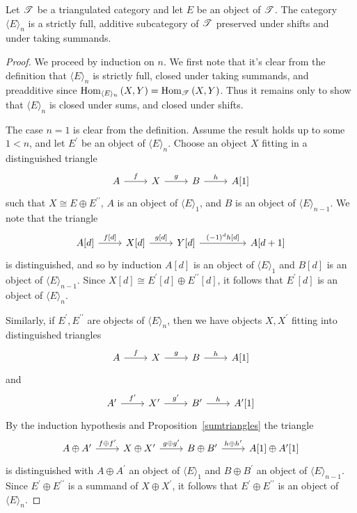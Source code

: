\documentclass[dissertation.tex]{subfiles}
\begin{document}
\begin{lem}
  Let $\mathscr{T}$ be a triangulated category and let $E$ be an object of $\mathscr{T}$.
  The category $\langle E \rangle_n$ is a strictly full, additive subcategory of $\mathscr{T}$ preserved under shifts and under taking summands.
  
  \begin{proof}
    We proceed by induction on $n$.
    We first note that it's clear from the definition that $\langle E \rangle_n$ is strictly full, closed under taking summands, and preadditive since $\operatorname{Hom}_{\langle E \rangle_n}\left(X,Y\right) = \operatorname{Hom}_{\mathscr{T}}\left(X,Y\right)$.
    Thus it remains only to show that $\langle E \rangle_n$ is closed under sums, and closed under shifts.
    
    The case $n = 1$ is clear from the definition.
    Assume the result holds up to some $1 < n$, and let $E^\prime$ be an object of $\langle E \rangle_n$.
    Choose an object $X$ fitting in a distinguished triangle
    $$\begin{tikzcd}
      A \arrow{r}{f} & X \arrow{r}{g} & B \arrow{r}{h} & A[1]
    \end{tikzcd}$$
    such that $X \cong E \oplus E^{\prime\prime}$, $A$ is an object of $\langle E \rangle_1$, and $B$ is an object of $\langle E \rangle_{n-1}$.
    We note that the triangle
    $$\begin{tikzcd}
      A[d] \arrow{r}{f[d]} & X[d] \arrow{r}{g[d]} & Y[d] \arrow{rr}{(-1)^{d}h[d]} && A[d+1]
    \end{tikzcd}$$
    is distinguished, and so by induction $A[d]$ is an object of $\langle E \rangle_1$ and $B[d]$ is an object of $\langle E \rangle_{n-1}$.
    Since $X[d] \cong E^\prime[d] \oplus E^{\prime\prime}[d]$, it follows that $E^\prime[d]$ is an object of $\langle E \rangle_n$.
    
    Similarly, if $E^\prime, E^{\prime\prime}$ are objects of $\langle E \rangle_n$, then we have objects $X, X^\prime$ fitting into distinguished triangles
    $$\begin{tikzcd}
      A \arrow{r}{f} & X \arrow{r}{g} & B \arrow{r}{h} & A[1]
    \end{tikzcd}$$
    and
    $$\begin{tikzcd}
      A^\prime \arrow{r}{f^\prime} & X^\prime \arrow{r}{g^\prime} & B^\prime \arrow{r}{h} & A^\prime[1]
    \end{tikzcd}$$
    By the induction hypothesis and Proposition~\ref{sumtriangles} the triangle
    $$\begin{tikzcd}
      A \oplus A^\prime \arrow{r}{f \oplus f^\prime} & X \oplus X^\prime \arrow{r}{g \oplus g^\prime} & B \oplus B^\prime \arrow{r}{h \oplus h^\prime} & A[1] \oplus A^\prime[1]
    \end{tikzcd}$$
    is distinguished with $A \oplus A^\prime$ an object of $\langle E \rangle_1$ and $B \oplus B^\prime$ an object of $\langle E \rangle_{n-1}$.
    Since $E^\prime \oplus E^{\prime\prime}$ is a summand of $X \oplus X^\prime$, it follows that $E^\prime \oplus E^{\prime\prime}$ is an object of $\langle E \rangle_n$.
  \end{proof}
\end{lem}
\end{document}
